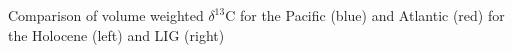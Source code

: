 Comparison of volume weighted $\delta^{13}$C for the Pacific (blue) and Atlantic (red) for the Holocene (left) and LIG (right)